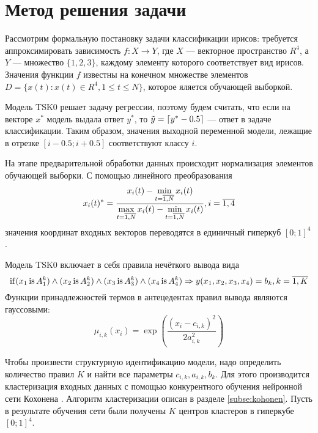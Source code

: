 \section{Метод решения задачи}
Рассмотрим формальную постановку задачи классификации ирисов: требуется аппроксимировать зависимость
\(f :X \rightarrow Y\),
где \(X\) --- векторное пространство \(R^4\), а \(Y\) --- множество \(\{1,2,3\}\),
каждому элементу которого соответствует вид ирисов. Значения функции \(f\) известны
на конечном множестве элементов \(D=\{x(t):x(t)\in R^4, 1 \leqslant t \leqslant N\}\),
которое яляется обучающей выборкой.
\par
Модель TSK0 решает задачу регрессии, поэтому будем считать, что если на векторе \(x^*\)
модель выдала ответ \(y^*\), то \(\tilde y = \lceil y^*-0.5\rceil\) --- ответ в задаче классификации.
Таким образом, значения выходной переменной модели, лежащие в отрезке \([i-0.5;i+0.5]\)
соответствуют классу \(i\).
\par
На этапе предварительной обработки данных происходит нормализация элементов обучающей выборки.
С помощью линейного преобразования
\begin{displaymath}
x_i(t)^* = \frac{\displaystyle x_i(t) - \min_{t=\overline{1,N}} x_i(t)}{ \\*
\displaystyle \max_{t=\overline{1,N}} x_i(t)-\min_{t=\overline{1,N}} x_i(t)}
,i=\overline{1,4}
\end{displaymath}
значения координат входных векторов переводятся в единичный гиперкуб \([0;1]^4\).
\par
Модель TSK0 включает в себя правила нечёткого вывода вида
\begin{displaymath}
\operatorname{if}(x_1 \operatorname{is} A_1^k) \land (x_2 \operatorname{is} A_2^k) \land (x_3 \operatorname{is} A_3^k) \land (x_4 \operatorname{is} A_4^k)\Rightarrow y(x_1,x_2,x_3,x_4)=b_k,
k=\overline{1,K}
\end{displaymath}
Функции принадлежностей термов в антецедентах правил вывода являются гауссовыми:
\begin{displaymath}
\mu_{i,k}(x_i)=\exp \left( \frac{(x_i-c_{i,k})^2}{2a_{i,k}^2} \right)
\end{displaymath}
\par
Чтобы произвести структурную идентификацию модели, надо определить количество правил \(K\) и
найти все параметры \(c_{i,k},a_{i,k},b_k\). Для этого производится кластеризация
входных данных с помощью конкурентного обучения нейронной сети Кохонена \cite{neuralNetworks}.
Алгоритм кластеризации описан в разделе \ref{subse:kohonen}.
Пусть в результате обучения сети были получены \(K\) центров кластеров в гиперкубе \([0;1]^4\).
